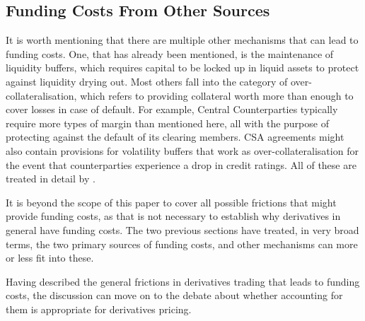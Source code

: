 \documentclass[main.tex]{subfiles}
\begin{document}
    \subsection{Funding Costs From Other Sources}
        It is worth mentioning that there are multiple other mechanisms 
        that can lead to funding costs.
        One, that has already been mentioned, is the maintenance of liquidity buffers,
        which requires capital to be locked up in liquid assets
        to protect against liquidity drying out.
        Most others fall into the category of over-collateralisation,
        which refers to providing collateral 
        worth more than enough to cover losses in case of default.
        For example, 
        Central Counterparties typically require more types of margin than mentioned here,
        all with the purpose of protecting against the default of its clearing members.
        CSA agreements might also contain provisions for volatility buffers
        that work as over-collateralisation 
        for the event that counterparties experience a drop in credit ratings.
        All of these are treated in detail by \textcite[Chapter 10]{Green2015XVA}.

        It is beyond the scope of this paper to cover all possible frictions 
        that might provide funding costs, 
        as that is not necessary to establish why derivatives in general have funding costs.
        The two previous sections have treated, in very broad terms, 
        the two primary sources of funding costs, 
        and other mechanisms can more or less fit into these.

        Having described the general frictions in derivatives trading that leads to funding costs,
        the discussion can move on to the debate about 
        whether accounting for them is appropriate for derivatives pricing.
\end{document}
